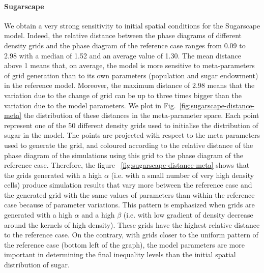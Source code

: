 \documentclass[3p,times,procedia]{elsarticle}
\begin{document}
\paragraph{Sugarscape} 



We obtain a very strong sensitivity to initial spatial conditions for the Sugarscape model. Indeed, the relative distance between the phase diagrams of different density grids and the phase diagram of the reference case ranges from 0.09 to 2.98 with a median of 1.52 and an average value of 1.30. The mean distance above 1 means that, on average, the model is more sensitive to meta-parameters of grid generation than to its own parameters (population and sugar endowment) in the reference model. Moreover, the maximum distance of 2.98 means that the variation due to the change of grid can be up to three times bigger than the variation due to the model parameters. We plot in Fig.~\ref{fig:sugarscape-distance-meta} the distribution of these distances in the meta-parameter space. Each point represent one of the 50 different density grids used to initialise the distribution of sugar in the model. The points are projected with respect to the meta-parameters used to generate the grid, and coloured according to the relative distance of the phase diagram of the simulations using this grid to the phase diagram of the reference case. Therefore, the figure ~\ref{fig:sugarscape-distance-meta} shows that the grids generated with a high $\alpha$ (i.e. with a small number of very high density cells) produce simulation results that vary more between the reference case and the generated grid with the same values of parameters than within the reference case because of parameter variations. This pattern is emphasized when grids are generated with a high $\alpha$ and a high $\beta$ (i.e. with low gradient of density decrease around the kernels of high density). These grids have the highest relative distance to the reference case. On the contrary, with grids closer to the uniform pattern of the reference case (bottom left of the graph), the model parameters are more important in determining the final inequality levels than the initial spatial distribution of sugar. 
\end{document}

